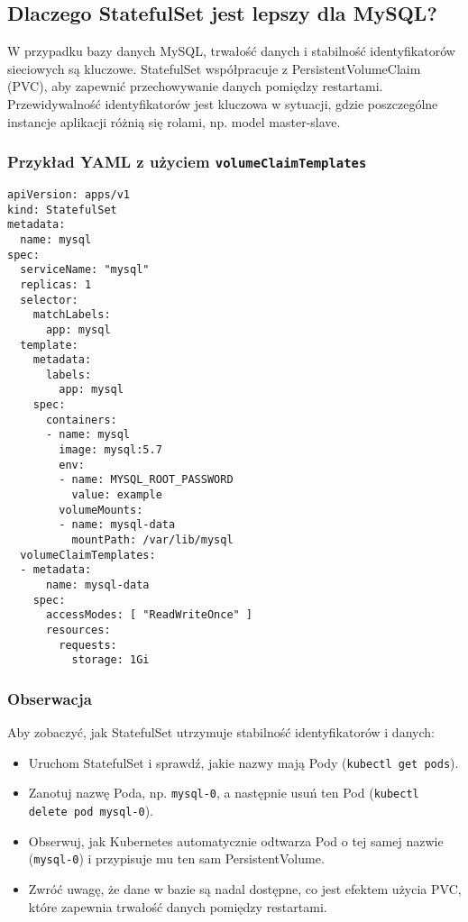 \documentclass{article}
\begin{document}
\subsection{Dlaczego StatefulSet jest lepszy dla MySQL?}
W przypadku bazy danych MySQL, trwałość danych i stabilność identyfikatorów sieciowych są kluczowe. StatefulSet współpracuje z PersistentVolumeClaim (PVC), aby zapewnić przechowywanie danych pomiędzy restartami. Przewidywalność identyfikatorów jest kluczowa w sytuacji, gdzie poszczególne instancje aplikacji różnią się rolami, np. model master-slave. 

\subsubsection{Przykład YAML z użyciem \texttt{volumeClaimTemplates}}
\begin{lstlisting}
apiVersion: apps/v1
kind: StatefulSet
metadata:
  name: mysql
spec:
  serviceName: "mysql"
  replicas: 1
  selector:
    matchLabels:
      app: mysql
  template:
    metadata:
      labels:
        app: mysql
    spec:
      containers:
      - name: mysql
        image: mysql:5.7
        env:
        - name: MYSQL_ROOT_PASSWORD
          value: example
        volumeMounts:
        - name: mysql-data
          mountPath: /var/lib/mysql
  volumeClaimTemplates:
  - metadata:
      name: mysql-data
    spec:
      accessModes: [ "ReadWriteOnce" ]
      resources:
        requests:
          storage: 1Gi
\end{lstlisting}

\subsubsection{Obserwacja}
Aby zobaczyć, jak StatefulSet utrzymuje stabilność identyfikatorów i danych:
\begin{itemize}
    \item Uruchom StatefulSet i sprawdź, jakie nazwy mają Pody (\texttt{kubectl get pods}).
    \item Zanotuj nazwę Poda, np. \texttt{mysql-0}, a następnie usuń ten Pod (\texttt{kubectl delete pod mysql-0}).
    \item Obserwuj, jak Kubernetes automatycznie odtwarza Pod o tej samej nazwie (\texttt{mysql-0}) i przypisuje mu ten sam PersistentVolume.
    \item Zwróć uwagę, że dane w bazie są nadal dostępne, co jest efektem użycia PVC, które zapewnia trwałość danych pomiędzy restartami.
\end{itemize}
\end{document}

